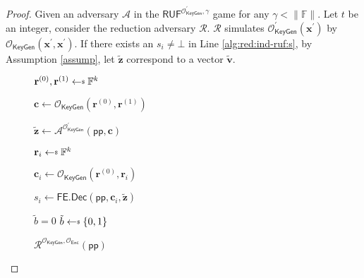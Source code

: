 \begin{proof}
Given an adversary $\mathcal{A}$ in the $\textsf{RUF}^{\mathcal{O}^\prime_{\textsf{KeyGen}}, \gamma}$ game for any $\gamma < \|\mathbb{F}\|$. Let $t$ be an integer, consider the reduction adversary $\mathcal{R}$. $\mathcal{R}$ simulates $\mathcal{O}_\textsf{KeyGen}^\prime(\mathbf{x}^\prime)$ by $\mathcal{O}_\textsf{KeyGen}(\mathbf{x}^\prime, \mathbf{x}^\prime)$.
If there exists an $s_i \neq \bot$ in Line \ref{alg:red:ind-ruf:s}, by Assumption \ref{assump}, let $\mathbf{\tilde{z}}$ correspond to a vector $\mathbf{\tilde{v}}$.

\begin{figure}[h]
\centering
	
	\begin{minipage}[t]{0.5\linewidth}
	\centering
	\begin{algorithm}[H]
	\caption{$\mathcal{R}^{\mathcal{O}_{\textsf{KeyGen}}, \mathcal{O}_{\textsf{Enc}}}(\textsf{pp})$}
	\label{alg:red:ind-ruf}
	\begin{algorithmic}[1]
		\State $\mathbf{r}^{(0)}, \mathbf{r}^{(1)} \getsdollar \mathbb{F}^{k}$
		
		\State $\mathbf{c} \gets \mathcal{O}_{\textsf{KeyGen}}(\mathbf{r}^{(0)}, \mathbf{r}^{(1)})$ 

		\State ${\mathbf{\tilde{z}}} \gets {\mathcal{A}}^{\mathcal{O}^\prime_{\textsf{KeyGen}}} (\textsf{pp}, \mathbf{c})$

		
			\State $\mathbf{r}_i \getsdollar \mathbb{F}^{k}$

			\State $\mathbf{c}_i \gets \mathcal{O}_{\textsf{KeyGen}}(\mathbf{r}^{(0)}, \mathbf{r}_i)$

			\State $s_i \gets \textsf{FE.Dec}( \textsf{pp}, \mathbf{c}_i, \mathbf{\tilde{z}} )$ \label{alg:red:ind-ruf:s}
	
		\EndFor	
		
		 \label{alg:red:ind-ruf:verify}
			\State \Return $\tilde{b} = 0$
		\Else
			\State \Return $\tilde{b} \getsdollar \{0, 1\}$
		\EndIf

	\end{algorithmic}
	\end{algorithm}
	\end{minipage}
	
\end{figure}



\end{proof}
